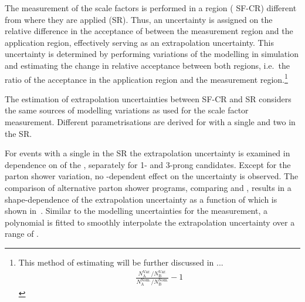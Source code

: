 
\begin{table}[htbp]
  \centering

  \caption{Uncertainty based on the comparison of scale factors
    measured for triggers with $\pTHLT > \SI{25}{\GeV}$ and
    $\pTHLT > \SI{35}{\GeV}$. The impact on the normalisation of
    \ttbar with a leading \tauhadvis candidate originating from jets
    and \pTvis close to the threshold of \SI{40}{\GeV} is shown.}%
  \label{tab:ttbarSF_tau25_35_uncertainty}

  
\end{table}

The measurement of the scale factors is performed in a region (\lephad
SF-CR) different from where they are applied (\hadhad SR). Thus, an
uncertainty is assigned on the relative difference in the acceptance
of \ttbarFakes between the measurement region and the application
region, effectively serving as an extrapolation uncertainty. This
uncertainty is determined by performing variations of the \ttbar
modelling in simulation and estimating the change in relative
acceptance between both regions, i.e.\ the ratio of the acceptance in
the application region and the measurement region.\footnote{This method
  of estimating will be further discussed in ...
  \begin{align*}
    \frac{N_\text{A}^\text{Var.} / N_\text{B}^\text{Var.}}{N_\text{A}^\text{Nom.} / N_\text{B}^\text{Nom.}} - 1
  \end{align*}
}

The estimation of extrapolation uncertainties between SF-CR and
\hadhad SR considers the same sources of \ttbar modelling variations
as used for the scale factor measurement. Different parametrisations
are derived for \ttbar with a single \faketauhadvis and two
\faketauhadvis in the \hadhad SR.

For \ttbar events with a single \faketauhadvis in the \hadhad SR the
extrapolation uncertainty is examined in dependence on \pT of the
\faketauhadvis, separately for 1- and 3-prong candidates. Except for
the parton shower variation, no \pT-dependent effect on the
uncertainty is observed.  The comparison of alternative parton shower
programs, comparing \PYTHIA[8] and \HERWIG[7], results in a
shape-dependence of the extrapolation uncertainty as a function of
\tauhadvis \pT which is shown in~.
Similar to the modelling uncertainties for the measurement, a
polynomial is fitted to smoothly interpolate the extrapolation
uncertainty over a range of \tauhadvis \pT. 

